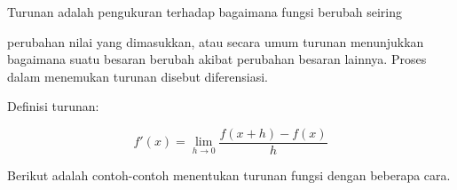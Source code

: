 \documentclass[a4paper,10pt]{article}
\begin{document}
\begin{eulernotebook}
\begin{eulercomment}
\begin{eulercomment}
\begin{eulercomment}
\end{eulercomment}
\begin{eulerttcomment}
  Turunan adalah pengukuran terhadap bagaimana fungsi berubah seiring
\end{eulerttcomment}
\begin{eulercomment}
perubahan nilai yang dimasukkan, atau secara umum turunan menunjukkan
bagaimana suatu besaran berubah akibat perubahan besaran lainnya.
Proses dalam menemukan turunan disebut diferensiasi.

Definisi turunan:\\
\end{eulercomment}
\begin{eulerformula}
\[
f'(x) = \lim_{h\to 0}\frac{f(x+h)-f(x)}{h}
\]
\end{eulerformula}
\begin{eulercomment}
Berikut adalah contoh-contoh menentukan turunan fungsi dengan beberapa
cara.


\end{eulercomment}
\end{eulercomment}
\end{eulercomment}
\end{eulernotebook}
\end{document}
